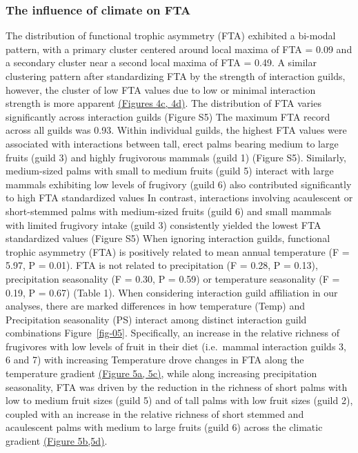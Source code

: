 \documentclass[
]{agujournal2019}
\begin{document}
\subsubsection{The influence of climate on
FTA}\label{the-influence-of-climate-on-fta}

The distribution of functional trophic asymmetry (FTA) exhibited a
bi-modal pattern, with a primary cluster centered around local maxima of
FTA = 0.09 and a secondary cluster near a second local maxima of FTA =
0.49. A similar clustering pattern after standardizing FTA by the
strength of interaction guilds, however, the cluster of low FTA values
due to low or minimal interaction strength is more apparent
\hyperref[fig04]{(Figures 4c, 4d)}. The distribution of FTA varies
significantly across interaction guilds (Figure S5) The maximum FTA
record across all guilds was 0.93. Within individual guilds, the highest
FTA values were associated with interactions between tall, erect palms
bearing medium to large fruits (guild 3) and highly frugivorous mammals
(guild 1) (Figure S5). Similarly, medium-sized palms with small to
medium fruits (guild 5) interact with large mammals exhibiting low
levels of frugivory (guild 6) also contributed significantly to high FTA
standardized values In contrast, interactions involving acaulescent or
short-stemmed palms with medium-sized fruits (guild 6) and small mammals
with limited frugivory intake (guild 3) consistently yielded the lowest
FTA standardized values (Figure S5) When ignoring interaction guilds,
functional trophic asymmetry (FTA) is positively related to mean annual
temperature (F = 5.97, P = 0.01). FTA is not related to precipitation (F
= 0.28, P = 0.13), precipitation seasonality (F = 0.30, P = 0.59) or
temperature seasonality (F = 0.19, P = 0.67) (Table 1). When considering
interaction guild affiliation in our analyses, there are marked
differences in how temperature (Temp) and Precipitation seasonality (PS)
interact among distinct interaction guild combinations
Figure~\ref{fig-05}. Specifically, an increase in the relative richness
of frugivores with low levels of fruit in their diet (i.e.~mammal
interaction guilds 3, 6 and 7) with increasing Temperature drove changes
in FTA along the temperature gradient \hyperref[fig-05]{(Figure 5a,
5c)}, while along increasing precipitation seasonality, FTA was driven
by the reduction in the richness of short palms with low to medium fruit
sizes (guild 5) and of tall palms with low fruit sizes (guild 2),
coupled with an increase in the relative richness of short stemmed and
acaulescent palms with medium to large fruits (guild 6) across the
climatic gradient \hyperref[fig-05]{(Figure 5b,5d)}.
\end{document}
